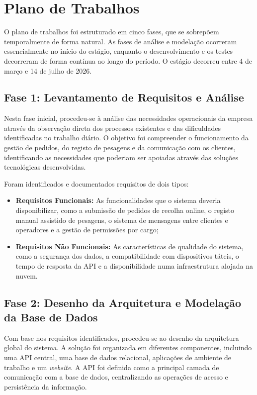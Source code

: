 \section{Plano de Trabalhos}\label{sec:plano-trabalhos}

O plano de trabalhos foi estruturado em cinco fases, que se sobrepõem temporalmente de forma natural. As fases de análise e modelação ocorreram essencialmente no início do estágio, enquanto o desenvolvimento e os testes decorreram de forma contínua ao longo do período. O estágio decorreu entre 4 de março e 14 de julho de 2026.

\subsection{Fase 1: Levantamento de Requisitos e Análise}

Nesta fase inicial, procedeu-se à análise das necessidades operacionais da empresa através da observação direta dos processos existentes e das dificuldades identificadas no trabalho diário. O objetivo foi compreender o funcionamento da gestão de pedidos, do registo de pesagens e da comunicação com os clientes, identificando as necessidades que poderiam ser apoiadas através das soluções tecnológicas desenvolvidas.

Foram identificados e documentados requisitos de dois tipos:
\begin{itemize}
    \item \textbf{Requisitos Funcionais:} As funcionalidades que o sistema deveria disponibilizar, como a submissão de pedidos de recolha online, o registo manual assistido de pesagens, o sistema de mensagens entre clientes e operadores e a gestão de permissões por cargo;
    \item \textbf{Requisitos Não Funcionais:} As características de qualidade do sistema, como a segurança dos dados, a compatibilidade com dispositivos táteis, o tempo de resposta da \ac{API} e a disponibilidade numa infraestrutura alojada na nuvem.
\end{itemize}

\subsection{Fase 2: Desenho da Arquitetura e Modelação da Base de Dados}

Com base nos requisitos identificados, procedeu-se ao desenho da arquitetura global do sistema. A solução foi organizada em diferentes componentes, incluindo uma \ac{API} central, uma base de dados relacional, aplicações de ambiente de trabalho e um \textit{website}. A \ac{API} foi definida como a principal camada de comunicação com a base de dados, centralizando as operações de acesso e persistência da informação.

